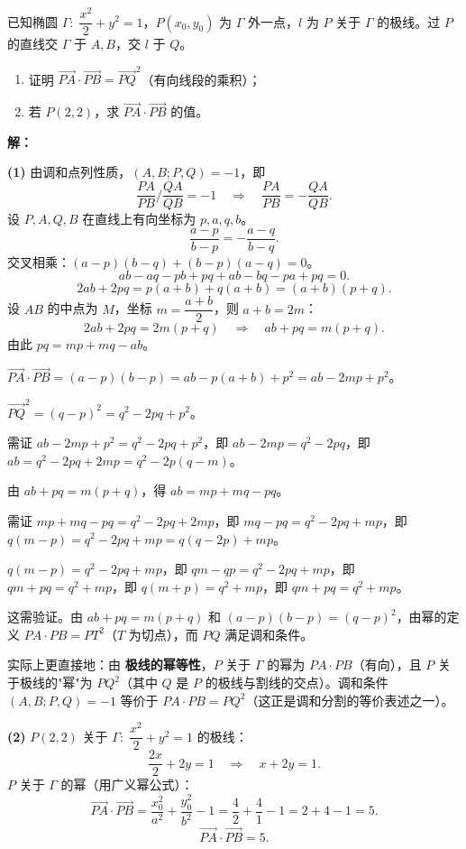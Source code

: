 \documentclass[12pt,a4paper]{ctexart}
\theoremstyle{definition}
\begin{document}
\vspace{8pt}

\begin{appbox}
已知椭圆 $\Gamma:\;\dfrac{x^2}{2}+y^2=1$，$P(x_0,y_0)$ 为 $\Gamma$ 外一点，$l$ 为 $P$ 关于 $\Gamma$ 的极线。过 $P$ 的直线交 $\Gamma$ 于 $A,B$，交 $l$ 于 $Q$。
\begin{enumerate}[label=(\arabic*)]
  \item 证明 $\overrightarrow{PA}\cdot\overrightarrow{PB}=\overrightarrow{PQ}^2$（有向线段的乘积）；
  \item 若 $P(2,2)$，求 $\overrightarrow{PA}\cdot\overrightarrow{PB}$ 的值。
\end{enumerate}
\end{appbox}

\begin{solutionbox}
\textbf{解：}

\textbf{(1)} 由调和点列性质，$(A,B;P,Q)=-1$，即
\[
  \frac{PA}{PB}\bigg/\frac{QA}{QB}=-1 \quad\Longrightarrow\quad \frac{PA}{PB}=-\frac{QA}{QB}.
\]
设 $P,A,Q,B$ 在直线上有向坐标为 $p,a,q,b$。
\[
  \frac{a-p}{b-p}=-\frac{a-q}{b-q}.
\]
交叉相乘：$(a-p)(b-q)+(b-p)(a-q)=0$。
\[
  ab-aq-pb+pq+ab-bq-pa+pq=0.
\]
\[
  2ab+2pq=p(a+b)+q(a+b)=(a+b)(p+q).
\]
设 $AB$ 的中点为 $M$，坐标 $m=\dfrac{a+b}{2}$，则 $a+b=2m$：
\[
  2ab+2pq=2m(p+q) \quad\Longrightarrow\quad ab+pq=m(p+q).
\]
由此 $pq=mp+mq-ab$。

$\overrightarrow{PA}\cdot\overrightarrow{PB}=(a-p)(b-p)=ab-p(a+b)+p^2=ab-2mp+p^2$。

$\overrightarrow{PQ}^2=(q-p)^2=q^2-2pq+p^2$。

需证 $ab-2mp+p^2=q^2-2pq+p^2$，即 $ab-2mp=q^2-2pq$，即 $ab=q^2-2pq+2mp=q^2-2p(q-m)$。

由 $ab+pq=m(p+q)$，得 $ab=mp+mq-pq$。

需证 $mp+mq-pq=q^2-2pq+2mp$，即 $mq-pq=q^2-2pq+mp$，即 $q(m-p)=q^2-2pq+mp=q(q-2p)+mp$。

$q(m-p)=q^2-2pq+mp$，即 $qm-qp=q^2-2pq+mp$，即 $qm+pq=q^2+mp$，即 $q(m+p)=q^2+mp$，即 $qm+pq=q^2+mp$。

这需验证。由 $ab+pq=m(p+q)$ 和 $(a-p)(b-p)=(q-p)^2$，由幂的定义 $PA\cdot PB=PT^2$（$T$ 为切点），而 $PQ$ 满足调和条件。

实际上更直接地：由 \textbf{极线的幂等性}，$P$ 关于 $\Gamma$ 的幂为 $PA\cdot PB$（有向），且 $P$ 关于极线的"幂"为 $PQ^2$（其中 $Q$ 是 $P$ 的极线与割线的交点）。调和条件 $(A,B;P,Q)=-1$ 等价于 $PA\cdot PB=PQ^2$（这正是调和分割的等价表述之一）。

\textbf{(2)} $P(2,2)$ 关于 $\Gamma:\;\dfrac{x^2}{2}+y^2=1$ 的极线：
\[
  \frac{2x}{2}+2y=1 \quad\Longrightarrow\quad x+2y=1.
\]
$P$ 关于 $\Gamma$ 的幂（用广义幂公式）：
\[
  \overrightarrow{PA}\cdot\overrightarrow{PB}=\frac{x_0^2}{a^2}+\frac{y_0^2}{b^2}-1=\frac{4}{2}+\frac{4}{1}-1=2+4-1=5.
\]
\[
  \boxed{\overrightarrow{PA}\cdot\overrightarrow{PB}=5.}
\]
\end{solutionbox}
\end{document}
